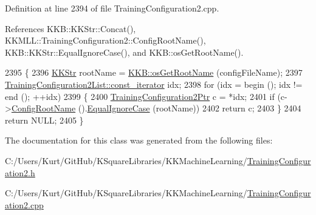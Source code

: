 Definition at line 2394 of file Training\+Configuration2.\+cpp.



References K\+K\+B\+::\+K\+K\+Str\+::\+Concat(), K\+K\+M\+L\+L\+::\+Training\+Configuration2\+::\+Config\+Root\+Name(), K\+K\+B\+::\+K\+K\+Str\+::\+Equal\+Ignore\+Case(), and K\+K\+B\+::os\+Get\+Root\+Name().


\begin{DoxyCode}
2395 \{
2396   \hyperlink{class_k_k_b_1_1_k_k_str}{KKStr}  rootName = \hyperlink{namespace_k_k_b_af5b668ed9902d7f93b62529664a739f0}{KKB::osGetRootName} (configFileName);
2397   \hyperlink{class_k_k_b_1_1_k_k_queue_aeb057c9c010446f46f57c1e355f981f1}{TrainingConfiguration2List::const\_iterator}  idx;
2398   \textcolor{keywordflow}{for}  (idx = begin ();  idx != end ();  ++idx)
2399   \{
2400     \hyperlink{class_k_k_m_l_l_1_1_training_configuration2}{TrainingConfiguration2Ptr} c = *idx;
2401     \textcolor{keywordflow}{if}  (c->\hyperlink{class_k_k_m_l_l_1_1_training_configuration2_a987a84624bebfb9806b708fa252cb98c}{ConfigRootName} ().\hyperlink{class_k_k_b_1_1_k_k_str_a562f9696417c53f66bc4088eac072ab5}{EqualIgnoreCase} (rootName))
2402       \textcolor{keywordflow}{return} c;
2403   \}
2404   \textcolor{keywordflow}{return} NULL;
2405 \}
\end{DoxyCode}


The documentation for this class was generated from the following files\+:\begin{DoxyCompactItemize}
\item 
C\+:/\+Users/\+Kurt/\+Git\+Hub/\+K\+Square\+Libraries/\+K\+K\+Machine\+Learning/\hyperlink{_training_configuration2_8h}{Training\+Configuration2.\+h}\item 
C\+:/\+Users/\+Kurt/\+Git\+Hub/\+K\+Square\+Libraries/\+K\+K\+Machine\+Learning/\hyperlink{_training_configuration2_8cpp}{Training\+Configuration2.\+cpp}\end{DoxyCompactItemize}
